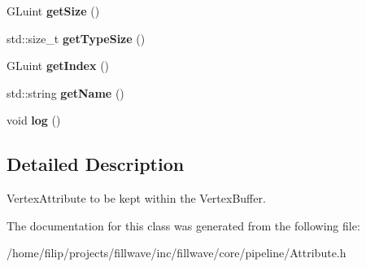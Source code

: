 \begin{DoxyCompactItemize}
G\+Luint {\bfseries get\+Size} ()
\item 
\mbox{\label{classflw_1_1flc_1_1Attribute_af90ea27f1a20d41141e47f852e5ee74f}} 
std\+::size\+\_\+t {\bfseries get\+Type\+Size} ()
\item 
\mbox{\label{classflw_1_1flc_1_1Attribute_a39b0a8b4c8a9217e668da11cea14f495}} 
G\+Luint {\bfseries get\+Index} ()
\item 
\mbox{\label{classflw_1_1flc_1_1Attribute_a13702b43cb77100a5ca11f1718097a7e}} 
std\+::string {\bfseries get\+Name} ()
\item 
\mbox{\label{classflw_1_1flc_1_1Attribute_a19bfd4b693aae71bfe6d336e16bf63af}} 
void {\bfseries log} ()
\end{DoxyCompactItemize}


\subsection{Detailed Description}
Vertex\+Attribute to be kept within the Vertex\+Buffer. 

The documentation for this class was generated from the following file\+:\begin{DoxyCompactItemize}
\item 
/home/filip/projects/fillwave/inc/fillwave/core/pipeline/Attribute.\+h\end{DoxyCompactItemize}
